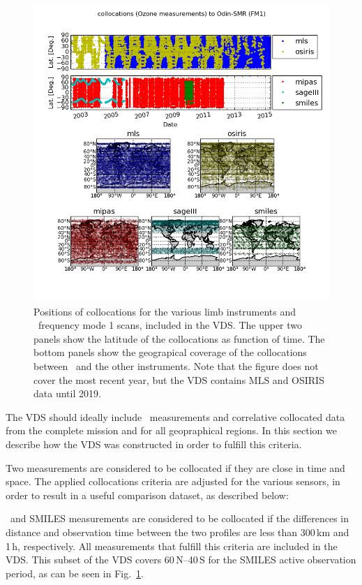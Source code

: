 \begin{figure}[t]
\centering
\includegraphics[width=17cm]{test_collocation_fm1.png}
\caption{Positions of collocations for the various limb instruments
and \smr\ frequency mode 1 scans, included in the VDS. The upper two panels show
the latitude of the collocations as function of time. The bottom panels
show the geograpical coverage of the collocations between \smr\
and the other instruments. Note that the figure does not cover the 
most recent year, but the VDS contains MLS and OSIRIS data until 2019.}
\label{fig:vdsfm1}
\end{figure}


The VDS should ideally include \smr\ measurements and correlative collocated 
data from the complete mission and for all geopraphical regions.
In this section we describe how the VDS was constructed
in order to fulfill this criteria.

Two measurements are considered to be collocated if they
are close in time and space. The applied collocations
criteria are adjusted for the various sensors, in order
to result in a useful comparison dataset, as described below:

\smr\ and SMILES measurements are considered to be collocated if the 
differences in distance and observation time between the two profiles are
less than 300\,km and 1\,h, respectively.
All measurements that fulfill this criteria are included
in the VDS. This subset of the VDS
covers 60\degree\,N--40\degree\,S for the SMILES
active observation period, as can be seen in Fig.~\ref{fig:vdsfm1}.

